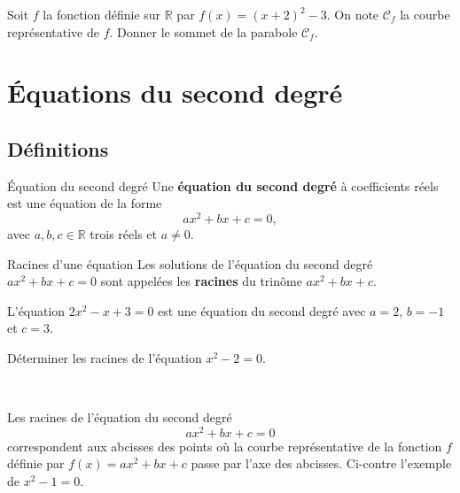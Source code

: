\documentclass[11pt]{article}
\begin{document}
\begin{app}
  Soit $f$ la fonction définie sur $\mathbb{R}$ par $f(x)=(x+2)^2-3$. On note
  $\mathscr C_f$ la courbe représentative de $f$. Donner le sommet de la
  parabole $\mathscr C_f$.
\end{app}

\section{Équations du second degré}

\subsection{Définitions} 
\begin{defi}{Équation du second degré}
  Une \textbf{équation du second degré} à coefficients réels est une équation de
  la forme
  \[
    ax^2+bx+c = 0,
  \]
  avec $a, b, c\in\mathbb{R}$ trois réels et $a\neq0$.
\end{defi}

\begin{defi}{Racines d'une équation}
  Les solutions de l'équation du second degré $ax^2+bx+c=0$ sont appelées les
  \textbf{racines} du trinôme $ax^2+bx+c$.
\end{defi}

\begin{exemple}
  L'équation $2x^2-x+3=0$ est une équation du second degré avec $a=2$, $b=-1$ et
  $c=3$.
\end{exemple}

\begin{app}
  Déterminer les racines de l'équation $x^2-2=0$.
\end{app}~\\[-13mm]
\begin{rmq}
  \begin{minipage}[]{.65\textwidth}
Les racines de l'équation du second degré
  \[
    ax^2+bx+c = 0
  \]
  correspondent aux abcisses des points où la courbe représentative de la
  fonction $f$ définie par $f(x)=ax^2+bx+c$ passe par l'axe des abcisses.
  Ci-contre l'exemple de $x^2-1=0$.
  \end{minipage}
  \begin{minipage}[]{.35\textwidth}
 \begin{center}
\end{center}
  \end{minipage}
\end{rmq}
\end{document}

